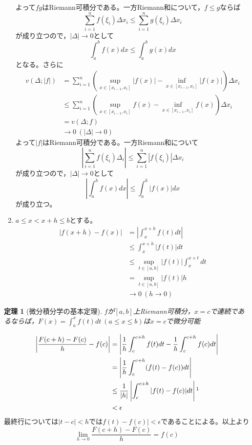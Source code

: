 \documentclass[dvipdfmx,a4j,10pt]{jsarticle}
\makeatletter
\theoremstyle{mystyle1}
\newtheorem{thm}[dfn]{定理}
\theoremstyle{mystyle2}
\renewenvironment{proof}[1][\proofname]{\par
  \pushQED{\qed}%
  \normalfont
  \topsep6\p@\@plus6\p@ \trivlist
  \item[\hskip\labelsep{\bfseries\sffamily #1}]\ignorespaces
}{%
  \popQED\endtrivlist\@endpefalse
}
\renewcommand\proofname{証明}
\makeatother
\begin{document}
\begin{proof}[命題\ref{prop10.4}の証明]
\begin{enumerate}
\[        \]
        よって$fg$はRiemann可積分である。一方Riemann和について，$f\leq g$ならば
        \[
        \sum_{i=1}^n f(\xi_i)\Delta x_i\leq\sum_{i=1}^n g(\xi_i)\Delta x_i
        \]
        が成り立つので，$|\Delta|\to0$として
        \[
        \int_a^b f(x)dx\leq\int_a^b g(x)dx
        \]
        となる。さらに
        \[
        \begin{split}
        v(\Delta;|f|)
        &=\sum_{i=1}^n\left(\sup_{x\in[x_{i-1},x_i]}|f(x)|-\inf_{x\in[x_{i-1},x_i]}|f(x)|\right)\Delta x_i\\
        &\leq\sum_{i=1}^n\left(\sup_{x\in[x_{i-1},x_i]}f(x)-\inf_{x\in[x_{i-1},x_i]}f(x)\right)\Delta x_i\\
        &=v(\Delta;f)\\
        &\to0\ (|\Delta|\to0)
        \end{split}
        \]
        よって$|f|$はRiemann可積分である。一方Riemann和について
        \[
        \left|\sum_{i=1}^n f(\xi_i)\Delta_i\right|\leq\sum_{i=1}^n|f(\xi_i)|\Delta x_i
        \]
        が成り立つので，$|\Delta|\to0$として
        \[
        \left|\int_a^b f(x)dx\right|\leq\int_a^b|f(x)|dx
        \]
        が成り立つ。
        \item
        $a\leq x<x+h\leq b$とする。
        \[
        \begin{split}
        |f(x+h)-f(x)|
        &=\left|\int_x^{x+h}f(t)dt\right|\\
        &\leq\int_x^{x+h}|f(t)|dt\\
        &\leq\sup_{t\in[a,b]}|f(t)|\int_x^{x+t}dt\\
        &= \sup_{t\in[a,b]}|f(t)|h\\
        &\to 0\ (h\to0)
        \end{split}
        \]
    \end{enumerate}
\end{proof}

\begin{framed}
    \begin{thm}[微分積分学の基本定理]\label{thm10.5}
    	$f$が$[a,b]$上Riemann可積分，$x=c$で連続であるならば，$\displaystyle F(x)=\int_a^x f(t)dt\ (a\leq x\leq b)$は$x=c$で微分可能
    \end{thm}
\end{framed}

\begin{proof}[定理\ref{thm10.5}の証明]
    \[
    \begin{split}
    \left|\frac{F(c+h)-F(c)}{h}-f(c)\right|
    &=\left|\frac{1}{h}\int_c^{c+h}f(t)dt-\frac{1}{h}\int_c^{c+h}f(c)dt\right|\\
    &=\left|\frac{1}{h}\int_c^{c+h}(f(t)-f(c))dt\right|\\
    &\leq\frac{1}{|h|}\left|\int_c^{c+h}|f(t)-f(c)|dt\right|\footnotemark\\
    &<\epsilon
    \end{split}
    \]
    最終行については$|t-c|<h$では$f(t)-f(c)|<\epsilon$であることによる。以上より
    \[
    \lim_{h\to0}\frac{F(c+h)-F(c)}{h}=f(c)
    \]
\end{proof}
\end{document}
